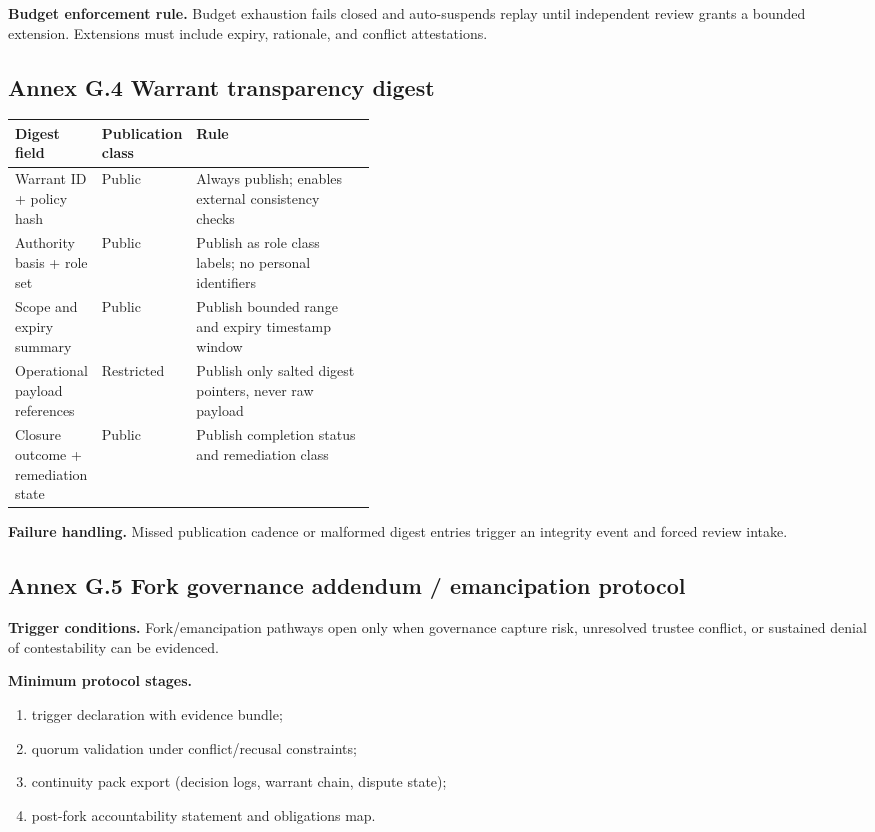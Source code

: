 \documentclass[11pt]{article}
\theoremstyle{definition}
\theoremstyle{plain}
\theoremstyle{remark}
\begin{document}
\textbf{Budget enforcement rule.}
Budget exhaustion fails closed and auto-suspends replay until independent review grants a bounded extension.
Extensions must include expiry, rationale, and conflict attestations.

\subsection{Annex G.4 Warrant transparency digest}
\label{ann:ext-digest}

\begin{center}
\small
\setlength{\tabcolsep}{6pt}
\renewcommand{\arraystretch}{1.2}
\begin{tabularx}{0.98\linewidth}{p{0.24\linewidth} p{0.18\linewidth} Y}
\textbf{Digest field} & \textbf{Publication class} & \textbf{Rule} \\ \hline
{}
Warrant ID + policy hash & Public & Always publish; enables external consistency checks \\
Authority basis + role set & Public & Publish as role class labels; no personal identifiers \\
Scope and expiry summary & Public & Publish bounded range and expiry timestamp window \\
Operational payload references & Restricted & Publish only salted digest pointers, never raw payload \\
Closure outcome + remediation state & Public & Publish completion status and remediation class \\
\end{tabularx}
\end{center}

\textbf{Failure handling.}
Missed publication cadence or malformed digest entries trigger an integrity event and forced review intake.

\subsection{Annex G.5 Fork governance addendum / emancipation protocol}
\label{ann:ext-fork}

\textbf{Trigger conditions.}
Fork/emancipation pathways open only when governance capture risk, unresolved trustee conflict, or sustained denial
of contestability can be evidenced.

\textbf{Minimum protocol stages.}
\begin{enumerate}[leftmargin=*]
  \item trigger declaration with evidence bundle;
  \item quorum validation under conflict/recusal constraints;
  \item continuity pack export (decision logs, warrant chain, dispute state);
  \item post-fork accountability statement and obligations map.
\end{enumerate}
\end{document}
